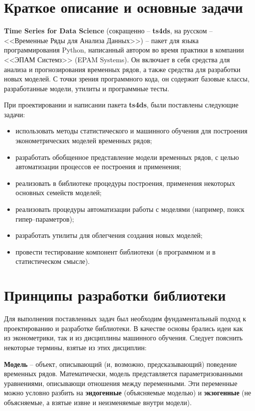 \documentclass[a4paper,14pt]{extreport}
\begin{document}
	\section{Краткое описание и основные задачи}
	
	\textbf{Time Series for Data Science} (сокращенно -- \textbf{ts4ds}, на русском -- <<Временные Ряды для Анализа Данных>>) -- пакет для языка программирования Python, написанный автором во время практики в компании <<ЭПАМ Системз>> (EPAM Systems). Он включает в себя средства для анализа и прогнозирования временных рядов, а также средства для разработки новых моделей. С точки зрения программного кода, он содержит базовые классы, разработанные модели, утилиты и программные тесты.
	
	При проектировании и написании пакета \textbf{ts4ds}, были поставлены следующие задачи:
	\begin{itemize}
		\item использовать методы статистического и машинного обучения для построения эконометрических моделей временных рядов;
		\item разработать обобщенное представление модели временных рядов, с целью автоматизации процессов ее построения и применения;
		\item реализовать в библиотеке процедуры построения, применения некоторых основных семейств моделей;
		\item реализовать процедуры автоматизации работы с моделями (например, поиск гипер--параметров);
		\item разработать утилиты для облегчения создания новых моделей;
		\item провести тестирование компонент библиотеки (в программном и в статистическом смысле).
	\end{itemize}
	
	\section{Принципы разработки библиотеки}
	
	Для выполнения поставленных задач был необходим фундаментальный подход к проектированию и разработке библиотеки. В качестве основы брались идеи как из эконометрики, так и из дисциплины машинного обучения. Следует пояснить некоторые термины, взятые из этих дисциплин:
	
	\textbf{Модель} -- объект, описывающий (и, возможно, предсказывающий) поведение временных рядов. Математически, модель представляется параметризованными уравнениями, описывающи отношения между переменными. Эти переменные можно условно разбить на \textbf{эндогенные} (объясняемые моделью) и \textbf{экзогенные} (не объясняемые, а взятые извне и неизменяемые внутри модели).
	
\end{document}
